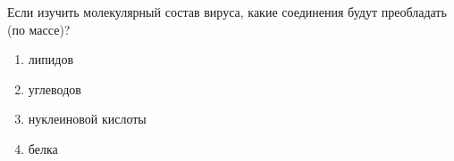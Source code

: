 
Если изучить молекулярный состав вируса, какие соединения будут преобладать (по массе)?

\begin{enumerate}
    \item липидов 
    \item углеводов 
    \item нуклеиновой кислоты 
    \item белка
\end{enumerate}

